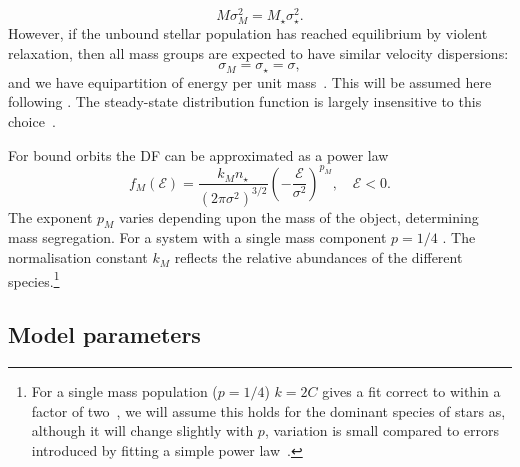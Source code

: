 \documentclass[useAMS,usedcolumn,usegraphicx,usenatbib]{mn2e}
\begin{document}
\begin{equation}
M \sigma_M^2 = M_\star \sigma_\star^2.
\end{equation}
However, if the unbound stellar population has reached equilibrium by violent relaxation, then all mass groups are expected to have similar velocity dispersions:
\begin{equation}
\sigma_M = \sigma_\star = \sigma,
\end{equation}
and we have equipartition of energy per unit mass~\citep{Lynden-Bell1967}. This will be assumed here following \citet{Alexander2009, O'Leary2009}. The steady-state distribution function is largely insensitive to this choice~\citep{Bahcall1977, Alexander2009}.

For bound orbits the DF can be approximated as a power law~\citep{Peebles1972}
\begin{equation}
f_M(\mathcal{E}) = \frac{k_M n_\star}{(2\pi\sigma^2)^{3/2}}\left(-\frac{\mathcal{E}}{\sigma^2}\right)^{p_M},\quad\mathcal{E} < 0.
\label{eq:Bound_DF}
\end{equation}
The exponent $p_M$ varies depending upon the mass of the object, determining mass segregation. For a system with a single mass component $p = 1/4$ \citet{Bahcall1976, Young1977}. The normalisation constant $k_M$ reflects the relative abundances of the different species.\footnote{For a single mass population ($p = 1/4$) $k = 2 C$ gives a fit correct to within a factor of two~\citep{Bahcall1976,Keshet2009}, we will assume this holds for the dominant species of stars as, although it will change slightly with $p$, variation is small compared to errors introduced by fitting a simple power law~\citep{Hopman2006, Alexander2009}.}

\subsection{Model parameters}
\end{document}
